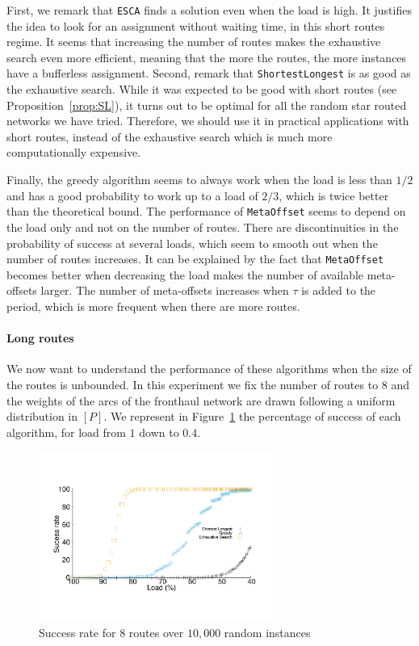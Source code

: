 \documentclass[a4paper,10pt]{journal}
\newcommand\shortestlongest{\texttt{ShortestLongest}\xspace}
\newcommand\metaoffset{\texttt{MetaOffset}\xspace}
\newcommand\ESCA{\texttt{ESCA}\xspace}
\begin{document}
      First, we remark that \ESCA finds a solution even when the load is high. It justifies the idea to look for an assignment without waiting time, in this short routes regime. 
      It seems that increasing the number of routes makes the exhaustive search even more efficient, meaning that the more the routes, the more instances have a bufferless assignment. 
      Second, remark that \shortestlongest is as good as the exhaustive search. While it was expected to be good with short routes (see Proposition~\ref{prop:SL}), it turns out to be optimal for all the random star routed networks we have tried. Therefore, we should use it in practical applications with short routes, instead of the exhaustive search which is much more computationally expensive. 

      Finally, the greedy algorithm seems to always work when the load is less than $1/2$ and has a good probability to work up to a load of $2/3$, which is twice better than the theoretical bound. The performance of \metaoffset seems to depend on the load only and not on the number of routes. There are discontinuities in the probability of success at several loads, which seem to smooth out when the number of routes increases. It can be explained by the fact that \metaoffset becomes better when decreasing the load makes the number of available meta-offsets larger. The number of meta-offsets increases when $\tau$ is added to the period, which is more frequent when there are more routes.
      
        \paragraph{Long routes}
      
      We now want to understand the performance of these algorithms when the size of the routes is unbounded. In this experiment we fix the number of routes to $8$ and the weights of the arcs of the fronthaul network are drawn following a uniform distribution in $[P]$. We represent in Figure~\ref{fig:long} the percentage of success of each algorithm, for load from $1$ down to $0.4$.
\begin{figure}[h]

       \begin{center}
      \includegraphics[width=0.7\textwidth]{echec_longues.pdf}
      \end{center}
        
      \caption{Success rate for $8$ routes over $10,000$ random instances}\label{fig:long}
     \end{figure}
      
\end{document}

